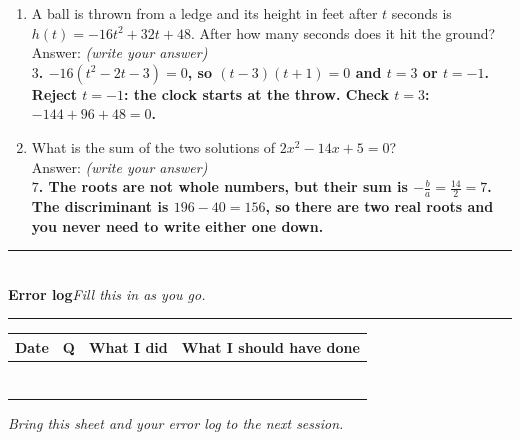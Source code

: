 \documentclass[11pt,a4paper]{article}
\newif\ifANSWERS
\newcommand{\PartHead}[2]{%
  \vspace{6pt}
  {\color{navy}\rule{\textwidth}{0.8pt}}\\[2pt]
  {\large\bfseries\color{navy}#1}\hfill{\small\itshape #2}\\[-4pt]
  {\color{navy}\rule{\textwidth}{0.4pt}}
  \vspace{4pt}
}
\newcommand{\spr}{\\[3pt]\hspace*{6pt}Answer: \underline{\hspace{3.2cm}}\hfill{\footnotesize\itshape(write your answer)}}
\newcommand{\ans}[1]{\ {\color{keyred}\bfseries #1}}
\newcommand{\ans}[1]{}
\begin{document}
\begin{enumerate}[leftmargin=20pt,itemsep=9pt]
\item A ball is thrown from a ledge and its height in feet after $t$ seconds is
  $h(t)=-16t^2+32t+48$. After how many seconds does it hit the ground? \spr
  \ans{\\ $3$. $-16(t^2-2t-3)=0$, so $(t-3)(t+1)=0$ and $t=3$ or $t=-1$. Reject $t=-1$: the clock starts at the throw. Check $t=3$: $-144+96+48=0$.}

\item What is the sum of the two solutions of $2x^2-14x+5=0$? \spr
  \ans{\\ $7$. The roots are not whole numbers, but their sum is $-\frac{b}{a}=\frac{14}{2}=7$. The discriminant is $196-40=156$, so there are two real roots and you never need to write either one down.}
\end{enumerate}

\ifANSWERS\else
\newpage
\PartHead{Error log}{Fill this in as you go.}
\begin{center}
\begin{tabularx}{\textwidth}{|c|c|X|X|}
\hline
\textbf{Date} & \textbf{Q} & \textbf{What I did} & \textbf{What I should have done}\\
\hline
\rule{0pt}{22pt} & & &\\ \hline
\rule{0pt}{22pt} & & &\\ \hline
\rule{0pt}{22pt} & & &\\ \hline
\rule{0pt}{22pt} & & &\\ \hline
\rule{0pt}{22pt} & & &\\ \hline
\rule{0pt}{22pt} & & &\\ \hline
\rule{0pt}{22pt} & & &\\ \hline
\end{tabularx}
\end{center}
\vspace{4pt}
\begin{center}\small\itshape
Bring this sheet and your error log to the next session.
\end{center}
\fi

\ifANSWERS
\vspace{8pt}
\PartHead{Five-minute marking routine}{Tutor}
\begin{enumerate}[leftmargin=20pt,itemsep=4pt]
\item \textbf{Score Part A only.} Below 8/10 means last week's translation work has not stuck, and the next session opens by repairing that rather than pushing further into quadratics.
\item \textbf{In Part C, count how many times he gave only the positive root.} Items 5 to 8 are built for it. That single error is the one to name out loud --- give it a number, say it once, and let him hear that every other mistake on the page is smaller than this one.
\item \textbf{Pick two wrong answers from Part E} and have him narrate his thinking out loud. Leave the rest unmarked.
\end{enumerate}
This is his first week of Advanced Math and he answered nothing in it on the diagnostic. Any part finished is progress worth saying out loud.
\fi
\end{document}
